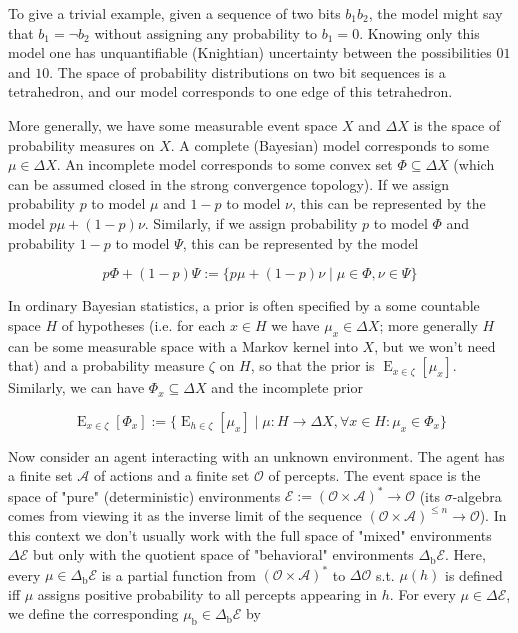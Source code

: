 \documentclass[a4paper]{article}
\DeclareMathOperator{\E}{E}
\newcommand{\SP}[1]{\Delta #1}
\newcommand{\Act}{\mathcal{A}}
\newcommand{\Per}{\mathcal{O}}
\newcommand{\His}{(\Per \times \Act)^*}
\newcommand{\Env}{\mathcal{E}}
\newcommand{\Beh}{\Delta_{\operatorname{b}}}
\newcommand{\EnvB}{\Beh\Env}
\begin{document}
To give a trivial example, given a sequence of two bits $b_1b_2$, the model might say that $b_1=\lnot b_2$ without assigning any probability to $b_1=0$. Knowing only this model one has unquantifiable (Knightian) uncertainty between the possibilities $01$ and $10$. The space of probability distributions on two bit sequences is a tetrahedron, and our model corresponds to one edge of this tetrahedron.

More generally, we have some measurable event space ${X}$ and ${\SP{X}}$ is the space of probability measures on ${X}$. A complete (Bayesian) model corresponds to some ${\mu \in \SP{X}}$. An incomplete model corresponds to some convex set ${\Phi \subseteq \SP{X}}$ (which can be assumed closed in the strong convergence topology). If we assign probability ${p}$ to model ${\mu}$ and ${1-p}$ to model ${\nu}$, this can be represented by the model ${p \mu + (1-p) \nu}$. Similarly, if we assign probability ${p}$ to model ${\Phi}$ and probability ${1-p}$ to model ${\Psi}$, this can be represented by the model 

$${p\Phi+(1-p)\Psi:=\{p \mu + (1-p) \nu \mid \mu \in \Phi, \nu \in \Psi\}}$$

In ordinary Bayesian statistics, a prior is often specified by a some countable space ${H}$ of hypotheses (i.e. for each ${x \in H}$ we have ${\mu_x \in \SP{X}}$; more generally ${H}$ can be some measurable space with a Markov kernel into ${X}$, but we won't need that) and a probability measure ${\zeta}$ on ${H}$, so that the prior is ${\E_{x \in \zeta}[\mu_x]}$. Similarly, we can have ${\Phi_x \subseteq \SP{X}}$ and the incomplete prior

$${\E_{x \in \zeta}[\Phi_x]:=\{\E_{h \in \zeta}[\mu_x] \mid \mu: H \rightarrow \SP{X}, \forall x \in H: \mu_x \in \Phi_x\}}$$

Now consider an agent interacting with an unknown environment. The agent has a finite set ${\Act}$ of actions and a finite set ${\Per}$ of percepts. The event space is the space of "pure" (deterministic) environments ${\Env:=\His \rightarrow \Per}$ (its ${\sigma}$-algebra comes from viewing it as the inverse limit of the sequence ${(\Per \times \Act)^{\leq n} \rightarrow \Per}$). In this context we don't usually work with the full space of "mixed" environments ${\SP{\Env}}$ but only with the quotient space of "behavioral" environments  ${\EnvB}$. Here, every ${\mu \in \EnvB}$ is a partial function from ${\His}$ to ${\SP{\Per}}$ s.t. ${\mu(h)}$ is defined iff ${\mu}$ assigns positive probability to all percepts appearing in ${h}$. For every ${\mu \in \SP{\Env}}$, we define the corresponding ${\mu_{\operatorname{b}} \in \EnvB}$ by
\end{document}
